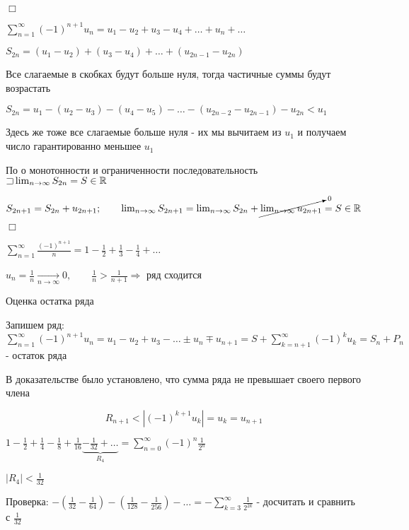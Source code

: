 \documentclass[12pt]{article}
\begin{document}
    \begin{MyProof}
        $\Box$

        $\sum_{n = 1}^\infty (-1)^{n + 1} u_n = u_1 - u_2 + u_3 - u_4 + \dots + u_n + \dots$

        $S_{2n} = (u_1 - u_2) + (u_3 - u_4) + \dots + (u_{2n - 1} - u_{2n})$

        Все слагаемые в скобках будут больше нуля, тогда частичные суммы будут возрастать

        $S_{2n} = u_1 - (u_2 - u_3) - (u_4 - u_5) - \dots - (u_{2n - 2} - u_{2n - 1}) - u_{2n} < u_1$

        Здесь же тоже все слагаемые больше нуля - их мы вычитаем из $u_1$ и получаем число гарантированно меньшее $u_1$

        По \Ths о монотонности и ограниченности последовательность $\mathord{\sqsupset} \lim_{n \to \infty} S_{2n} = S \in \mathbb{R}$

        $S_{2n + 1} = S_{2n} + u_{2n + 1}; \qquad \lim_{n \to \infty} S_{2n + 1} = \lim_{n \to \infty} S_{2n} + \cancelto{0}{\lim_{n \to \infty} u_{2n + 1}} = S \in \mathbb{R}$

        $\Box$
    \end{MyProof}

    \Exs $\sum_{n = 1}^\infty \frac{(-1)^{n + 1}}{n} = 1 - \frac{1}{2} + \frac{1}{3} - \frac{1}{4} + \dots$

    $u_n = \frac{1}{n} \underset{n \to \infty}{\longrightarrow} 0, \qquad \frac{1}{n} > \frac{1}{n + 1} \Longrightarrow$ ряд сходится

    \Nota Оценка остатка ряда

    Запишем ряд: $\sum_{n = 1}^\infty (-1)^{n + 1} u_n = u_1 - u_2 + u_3 - \dots \pm u_n \mp u_{n + 1} =
    S + \sum_{k = n + 1}^\infty (-1)^{k} u_k = S_n + P_n$ - остаток ряда

    В доказательстве \Ths было установлено, что сумма ряда не превышает своего первого члена

    \[R_{n + 1} < |(-1)^{k + 1} u_k| = u_k = u_{n + 1}\]

    \Ex $1 - \frac{1}{2} + \frac{1}{4} - \frac{1}{8} + \frac{1}{16} \underset{R_4}{\underbrace{ - \frac{1}{32} + \dots}} = \sum_{n = 0}^\infty (-1)^n \frac{1}{2^n}$

    $|R_4| < \frac{1}{32}$

    Проверка: $-(\frac{1}{32} - \frac{1}{64}) - (\frac{1}{128} - \frac{1}{256}) - \dots = -\sum_{k = 3}^\infty \frac{1}{2^{2k}}$ - \Lab досчитать и сравнить с $\frac{1}{32}$
\end{document}
